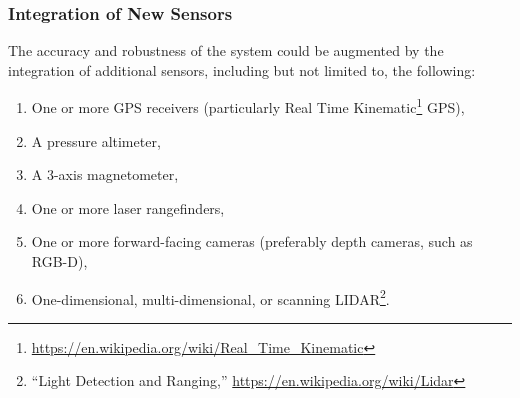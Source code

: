 \subsubsection{Integration of New Sensors}
The accuracy and robustness of the system could be augmented by the integration of additional sensors, including but not limited to, the following:
\begin{enumerate}
    \item One or more GPS receivers (particularly Real Time Kinematic\footnote{\url{https://en.wikipedia.org/wiki/Real_Time_Kinematic}} GPS),
    \item A pressure altimeter,
    \item A 3-axis magnetometer,
    \item One or more laser rangefinders,
    \item One or more forward-facing cameras (preferably depth cameras, such as RGB-D),
    \item One-dimensional, multi-dimensional, or scanning LIDAR\footnote{``Light Detection and Ranging,'' \url{https://en.wikipedia.org/wiki/Lidar}}.
\end{enumerate}

\begin{comment}
\begin{center}
\begin{tabular}{ m{0.25\textwidth} | m{0.65\textwidth} }
 GPS & Position (and orientation, if using multiple receivers for differential GPS) \\
 Pressure Altimeter & Altitude \\
 3-Axis Magnetometer & Heading angle \\
 Ventral Laser Rangefinder & Altitude \\
 Longitudinal/Lateral Laser Rangefinders & Distance to obstacles \\
 Forward-Facing Camera & Roll angle, distance to obstacles \\
 1D LIDAR & Similar to Laser Rangefinder \\
 Multi-dimensional/Scanning LIDAR & Full 3D map of surroundings, distance to obstacles
\end{tabular}
\end{center}
\end{comment}

